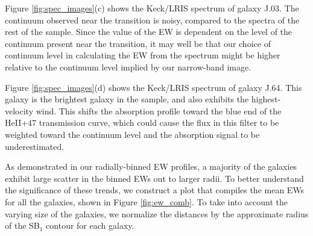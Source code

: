 \documentclass[twocolumn]{aastex61}
\begin{document}
Figure \ref{fig:spec_images}(c) shows the Keck/LRIS spectrum of galaxy J.03. The continuum observed near the  transition is noisy, compared to the spectra of the rest of the sample. Since the value of the EW is dependent on the level of the continuum present near the  transition, it may well be that our choice of continuum level in calculating the EW from the spectrum might be higher relative to the continuum level implied by our narrow-band image.

Figure \ref{fig:spec_images}(d) shows the Keck/LRIS spectrum of galaxy J.64. This galaxy is the brightest galaxy in the sample, and also exhibits the highest-velocity wind.  This shifts the  absorption profile toward the blue end of the 
HeII+47 transmission curve, which could cause the flux in this filter to be weighted toward the continuum level and the absorption signal to be underestimated.



As demonstrated in our radially-binned EW profiles, a majority of the galaxies exhibit large scatter in the binned EWs out to larger radii. To better understand the significance of these trends, we construct a plot that compiles the mean EWs for all the galaxies, shown in Figure \ref{fig:ew_comb}. To take into account the varying size of the galaxies, we normalize the distances by the approximate radius of the SB$_1$ contour for each galaxy. 
\end{document}
